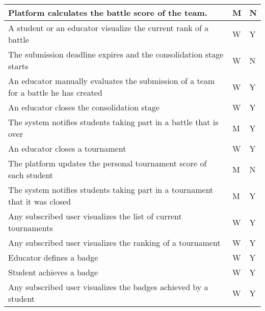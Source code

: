 \begin{longtable}{|p{8.7cm}|p{3cm}|p{3cm}|}
    Platform calculates the battle score of the team.                                                                                     & M                      & N               \\ \hline
    A student or an educator visualize the current rank of a battle                                                                       & W                      & Y               \\ \hline
    The submission deadline expires and the consolidation stage starts                                                                    & W                      & N               \\ \hline
    An educator manually evaluates the submission of a team for a battle he has created                                                   & W                      & Y               \\ \hline
    An educator closes the consolidation stage                                                                                            & W                      & Y               \\ \hline
    The system notifies students taking part in a battle that is over                                                                     & M                      & Y               \\ \hline
    An educator closes a tournament                                                                                                       & W                      & Y               \\ \hline
    The platform updates the personal tournament score of each student                                                                    & M                      & N               \\ \hline
    The system notifies students taking part in a tournament that it was closed                                                           & M                      & Y               \\ \hline
    Any subscribed user visualizes the list of current tournaments                                                                        & W                      & Y               \\ \hline
    Any subscribed user visualizes the ranking of a tournament                                                                            & W                      & Y               \\ \hline
    Educator defines a badge                                                                                                              & W                      & Y               \\ \hline
    Student achieves a badge                                                                                                              & W                      & Y               \\ \hline
    Any subscribed user visualizes the badges achieved by a student                                                                       & W                      & Y               \\ \hline
\end{longtable}



